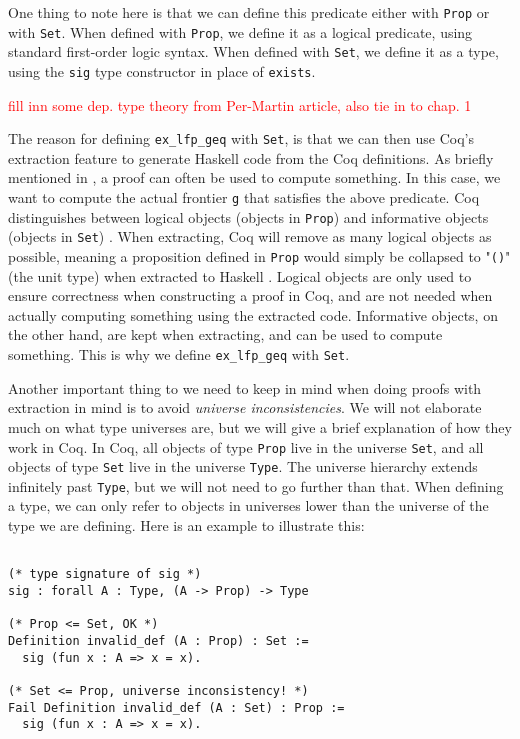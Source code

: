 One thing to note here is that we can define this predicate either with \lstinline{Prop} or with \lstinline{Set}.
When defined with \lstinline{Prop}, we define it as a logical predicate, using standard first-order logic syntax.
When defined with \lstinline{Set}, we define it as a type,
using the \lstinline{sig} type constructor in place of \lstinline{exists}.

\textcolor{red}{fill inn some dep. type theory from Per-Martin article, also tie in to chap. 1}

The reason for defining \lstinline{ex_lfp_geq} with \lstinline{Set}, is that we can then use
Coq's extraction feature to generate Haskell code from the Coq definitions.
As briefly mentioned in , a proof can often be used to compute something.
In this case, we want to compute the actual frontier \lstinline{g} that satisfies the above predicate.
Coq distinguishes between logical objects (objects in \lstinline{Prop}) and informative objects (objects in \lstinline{Set})
\cite[p.~1-2]{coqextrnew}.
When extracting, Coq will remove as many logical objects as possible, meaning a proposition defined in \lstinline{Prop}
would simply be collapsed to "\lstinline[language=Haskell]{()}" (the unit type) when extracted to Haskell
\cite[p.~8]{coqextroverview}.
Logical objects are only used to ensure correctness when constructing a proof in Coq,
and are not needed when actually computing something using the extracted code.
Informative objects, on the other hand, are kept when extracting, and can be used to compute something.
This is why we define \lstinline{ex_lfp_geq} with \lstinline{Set}.

Another important thing to we need to keep in mind when doing proofs with extraction in mind is to avoid \emph{universe inconsistencies}.
We will not elaborate much on what type universes are, but we will give a brief explanation of how they work in Coq.
In Coq, all objects of type \lstinline{Prop} live in the universe \lstinline{Set}, and all objects of type \lstinline{Set}
live in the universe \lstinline{Type}. The universe hierarchy extends infinitely past \lstinline{Type}, but we will not
need to go further than that.
When defining a type, we can only refer to objects in universes lower than the universe of the type we are defining.
Here is an example to illustrate this:

\begin{minipage}{\linewidth}
\begin{lstlisting}[language=Coq, label={lst:universe_inconsistency}, caption={A universe inconsistency in Coq}]

(* type signature of sig *)
sig : forall A : Type, (A -> Prop) -> Type

(* Prop <= Set, OK *)
Definition invalid_def (A : Prop) : Set :=
  sig (fun x : A => x = x).

(* Set <= Prop, universe inconsistency! *)
Fail Definition invalid_def (A : Set) : Prop :=
  sig (fun x : A => x = x).
\end{lstlisting}
\end{minipage}



